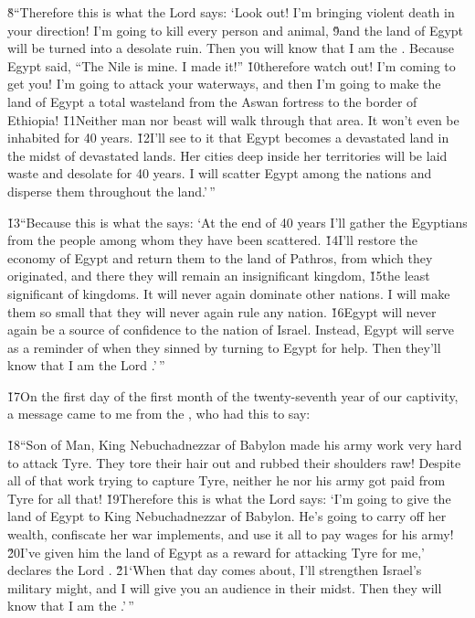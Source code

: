 \v{8}``Therefore this is what the Lord  says: `Look out! I'm bringing violent death in your direction! I'm going to kill every person and animal, \v{9}and the land of Egypt will be turned into a desolate ruin. Then you will know that I am the . Because Egypt said, ``The Nile is mine. I made it!'' \v{10}therefore watch out! I'm coming to get you! I'm going to attack your waterways, and then I'm going to make the land of Egypt a total wasteland from the Aswan fortress to the border of Ethiopia! \v{11}Neither man nor beast will walk through that area. It won't even be inhabited for 40 years. \v{12}I'll see to it that Egypt becomes a devastated land in the midst of devastated lands. Her cities deep inside her territories will be laid waste and desolate for 40 years. I will scatter Egypt among the nations and disperse them throughout the land.'\,''

\v{13}``Because this is what the  says: `At the end of 40 years I'll gather the Egyptians from the people among whom they have been scattered. \v{14}I'll restore the economy of Egypt and return them to the land of Pathros, from which they originated, and there they will remain an insignificant kingdom, \v{15}the least significant of kingdoms. It will never again dominate other nations. I will make them so small that they will never again rule any nation. \v{16}Egypt will never again be a source of confidence to the nation of Israel. Instead, Egypt will serve as a reminder of when they sinned by turning to Egypt for help. Then they'll know that I am the Lord .'\,''

\v{17}On the first day of the first month of the twenty-seventh year of our captivity, a message came to me from the , who had this to say:

\v{18}``Son of Man, King Nebuchadnezzar of Babylon made his army work very hard to attack Tyre. They tore their hair out and rubbed their shoulders raw! Despite all of that work trying to capture Tyre, neither he nor his army got paid from Tyre for all that! \v{19}Therefore this is what the Lord  says: `I'm going to give the land of Egypt to King Nebuchadnezzar of Babylon. He's going to carry off her wealth, confiscate her war implements, and use it all to pay wages for his army! \v{20}I've given him the land of Egypt as a reward for attacking Tyre for me,' declares the Lord . \v{21}`When that day comes about, I'll strengthen Israel's military might, and I will give you an audience in their midst. Then they will know that I am the .'\,''

